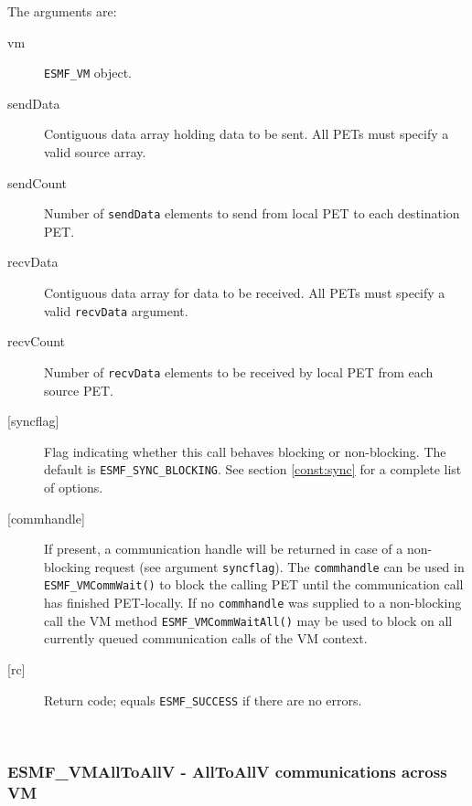      The arguments are:
     \begin{description}
     \item[vm] 
          {\tt ESMF\_VM} object.
     \item[sendData]
          Contiguous data array holding data to be sent. All PETs must specify a
          valid source array.
     \item[sendCount] 
          Number of {\tt sendData} elements to send from local PET to
          each destination PET.
     \item[recvData] 
          Contiguous data array for data to be received. All PETs must specify a
          valid {\tt recvData} argument.
     \item[recvCount] 
          Number of {\tt recvData} elements to be received by local PET from
          each source PET.
     \item[{[syncflag]}]
          Flag indicating whether this call behaves blocking or non-blocking.
          The default is {\tt ESMF\_SYNC\_BLOCKING}. See section
          \ref{const:sync} for a complete list of options.
     \item[{[commhandle]}]
          If present, a communication handle will be returned in case of a 
          non-blocking request (see argument {\tt syncflag}). The
          {\tt commhandle} can be used in {\tt ESMF\_VMCommWait()} to block the
          calling PET until the communication call has finished PET-locally. If
          no {\tt commhandle} was supplied to a non-blocking call the VM method
          {\tt ESMF\_VMCommWaitAll()} may be used to block on all currently queued
          communication calls of the VM context.
     \item[{[rc]}] 
          Return code; equals {\tt ESMF\_SUCCESS} if there are no errors.
     \end{description}
   
 
\mbox{}\hrulefill\ 
 
\subsubsection [ESMF\_VMAllToAllV] {ESMF\_VMAllToAllV - AllToAllV communications across VM}


